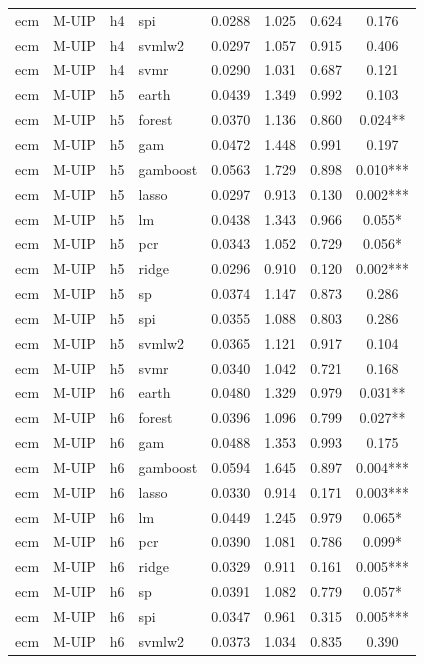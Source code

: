 \begin{ThreePartTable}
\begin{longtable}[t]{llclcccc}
ecm & M-UIP & h4 & spi & 0.0288 & 1.025 & 0.624 & 0.176\\
ecm & M-UIP & h4 & svmlw2 & 0.0297 & 1.057 & 0.915 & 0.406\\
ecm & M-UIP & h4 & svmr & 0.0290 & 1.031 & 0.687 & 0.121\\
\addlinespace
ecm & M-UIP & h5 & earth & 0.0439 & 1.349 & 0.992 & 0.103\\
ecm & M-UIP & h5 & forest & 0.0370 & 1.136 & 0.860 & 0.024**\\
ecm & M-UIP & h5 & gam & 0.0472 & 1.448 & 0.991 & 0.197\\
ecm & M-UIP & h5 & gamboost & 0.0563 & 1.729 & 0.898 & 0.010***\\
ecm & M-UIP & h5 & lasso & 0.0297 & 0.913 & 0.130 & 0.002***\\
ecm & M-UIP & h5 & lm & 0.0438 & 1.343 & 0.966 & 0.055*\\
ecm & M-UIP & h5 & pcr & 0.0343 & 1.052 & 0.729 & 0.056*\\
ecm & M-UIP & h5 & ridge & 0.0296 & 0.910 & 0.120 & 0.002***\\
ecm & M-UIP & h5 & sp & 0.0374 & 1.147 & 0.873 & 0.286\\
ecm & M-UIP & h5 & spi & 0.0355 & 1.088 & 0.803 & 0.286\\
ecm & M-UIP & h5 & svmlw2 & 0.0365 & 1.121 & 0.917 & 0.104\\
ecm & M-UIP & h5 & svmr & 0.0340 & 1.042 & 0.721 & 0.168\\
\addlinespace
ecm & M-UIP & h6 & earth & 0.0480 & 1.329 & 0.979 & 0.031**\\
ecm & M-UIP & h6 & forest & 0.0396 & 1.096 & 0.799 & 0.027**\\
ecm & M-UIP & h6 & gam & 0.0488 & 1.353 & 0.993 & 0.175\\
ecm & M-UIP & h6 & gamboost & 0.0594 & 1.645 & 0.897 & 0.004***\\
ecm & M-UIP & h6 & lasso & 0.0330 & 0.914 & 0.171 & 0.003***\\
ecm & M-UIP & h6 & lm & 0.0449 & 1.245 & 0.979 & 0.065*\\
ecm & M-UIP & h6 & pcr & 0.0390 & 1.081 & 0.786 & 0.099*\\
ecm & M-UIP & h6 & ridge & 0.0329 & 0.911 & 0.161 & 0.005***\\
ecm & M-UIP & h6 & sp & 0.0391 & 1.082 & 0.779 & 0.057*\\
ecm & M-UIP & h6 & spi & 0.0347 & 0.961 & 0.315 & 0.005***\\
ecm & M-UIP & h6 & svmlw2 & 0.0373 & 1.034 & 0.835 & 0.390\\

\end{longtable}
\end{ThreePartTable}
